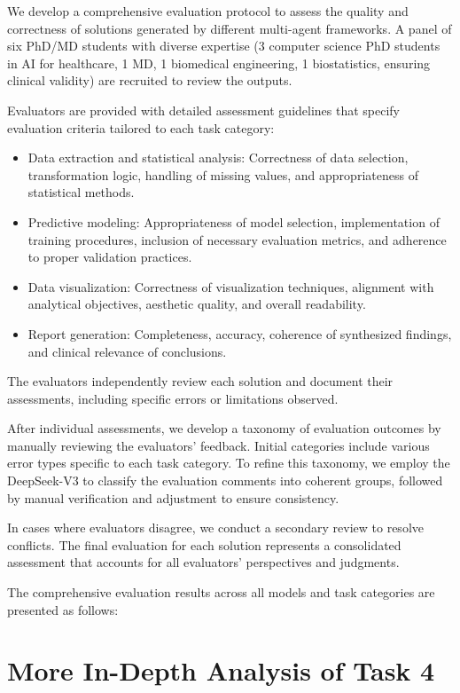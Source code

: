 \documentclass{article}
\begin{document}
We develop a comprehensive evaluation protocol to assess the quality and correctness of solutions generated by different multi-agent frameworks. A panel of six PhD/MD students with diverse expertise (3 computer science PhD students in AI for healthcare, 1 MD, 1 biomedical engineering, 1 biostatistics, ensuring clinical validity) are recruited to review the outputs. 

Evaluators are provided with detailed assessment guidelines that specify evaluation criteria tailored to each task category:
\begin{itemize}
    \item Data extraction and statistical analysis: Correctness of data selection, transformation logic, handling of missing values, and appropriateness of statistical methods.
    \item Predictive modeling: Appropriateness of model selection, implementation of training procedures, inclusion of necessary evaluation metrics, and adherence to proper validation practices.
    \item Data visualization: Correctness of visualization techniques, alignment with analytical objectives, aesthetic quality, and overall readability.
    \item Report generation: Completeness, accuracy, coherence of synthesized findings, and clinical relevance of conclusions.
\end{itemize}

The evaluators independently review each solution and document their assessments, including specific errors or limitations observed. 

After individual assessments, we develop a taxonomy of evaluation outcomes by manually reviewing the evaluators' feedback. Initial categories include various error types specific to each task category. To refine this taxonomy, we employ the DeepSeek-V3 to classify the evaluation comments into coherent groups, followed by manual verification and adjustment to ensure consistency.

In cases where evaluators disagree, we conduct a secondary review to resolve conflicts. The final evaluation for each solution represents a consolidated assessment that accounts for all evaluators' perspectives and judgments.

The comprehensive evaluation results across all models and task categories are presented as follows:



\section{More In-Depth Analysis of Task 4}
\label{sec:app_task4_additional_analyses}
\end{document}
